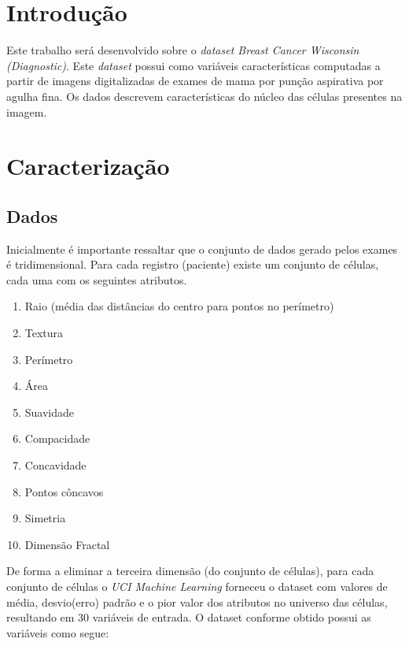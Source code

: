 \documentclass[11pt,a4paper]{article}
\numberwithin{equation}{section}
\begin{document}

\section{Introdução}
Este trabalho será desenvolvido sobre o \textit{dataset Breast Cancer Wisconsin (Diagnostic)}. Este \textit{dataset} possui como variáveis características computadas a partir de imagens digitalizadas de exames de mama por punção aspirativa por agulha fina. Os dados descrevem características do núcleo das células presentes na imagem. 
\section{Caracterização}

\subsection{Dados}


Inicialmente é importante ressaltar que o conjunto de dados gerado pelos exames é tridimensional. Para cada registro (paciente) existe um conjunto de células, cada uma com os seguintes atributos.

\begin{enumerate}
\item Raio (média das distâncias do centro para pontos no perímetro)
\item Textura
\item Perímetro
\item Área
\item Suavidade
\item Compacidade
\item Concavidade
\item Pontos côncavos
\item Simetria
\item Dimensão Fractal
\end{enumerate}

De forma a eliminar a terceira dimensão (do conjunto de células), para cada conjunto de células o \textit{UCI Machine Learning} forneceu o dataset com valores de média, desvio(erro) padrão e o pior valor dos atributos no universo das células, resultando em 30 variáveis de entrada. O dataset conforme obtido possui as variáveis como segue:
\end{document}
